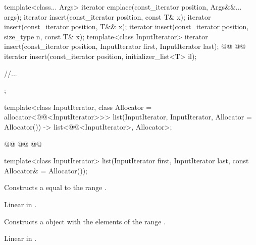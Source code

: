 \documentclass{wg21}
\begin{document}
\begin{codeblock}
{{        template<class... Args> iterator emplace(const_iterator position, Args&&... args);
        iterator insert(const_iterator position, const T& x);
        iterator insert(const_iterator position, T&& x);
        iterator insert(const_iterator position, size_type n, const T& x);
        template<class InputIterator>
        iterator insert(const_iterator position, InputIterator first, InputIterator last);
        @@
        @@
        iterator insert(const_iterator position, initializer_list<T> il);

        //...
    };

    template<class InputIterator, class Allocator = allocator<@@<InputIterator>>>
    list(InputIterator, InputIterator, Allocator = Allocator())
    -> list<@@<InputIterator>, Allocator>;

    @@
    @@
    @@
}
\end{codeblock}


%
\begin{itemdecl}
    template<class InputIterator>
    list(InputIterator first, InputIterator last, const Allocator& = Allocator());
\end{itemdecl}

\begin{itemdescr}
    \pnum
    \effects
    Constructs a
    equal to the range
    .

    \pnum
    \complexity
    Linear in
    .
\end{itemdescr}

\begin{addedblock}
\begin{itemdecl}
template<@@ R>}
list(from_range_t, R&& range, const Allocator& = Allocator());
\end{itemdecl}

\begin{itemdescr}
    \pnum
    \effects
    Constructs a  object with the elements of the range .

    \pnum
    \complexity
    Linear in .
\end{itemdescr}
\end{addedblock}
\end{document}
